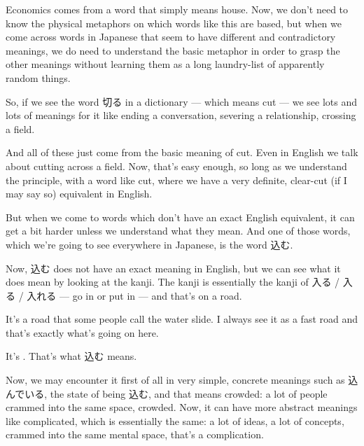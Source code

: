 Economics comes from a word that simply means house. Now, we don't need to know the physical metaphors on which words like this are based, but when we come across words in Japanese that seem to have different and contradictory meanings, we do need to understand the basic metaphor in order to grasp the other meanings without learning them as a long laundry-list of apparently random things.

So, if we see the word 切る in a dictionary --- which means cut --- we see lots and lots of meanings for it like ending a conversation, severing a relationship, crossing a field.

{}

And all of these just come from the basic meaning of cut. Even in English we talk about cutting across a field. Now, that's easy enough, so long as we understand the principle, with a word like cut, where we have a very definite, clear-cut (if I may say so) equivalent in English.

But when we come to words which don't have an exact English equivalent, it can get a bit harder unless we understand what they mean. And one of those words, which we're going to see everywhere in Japanese, is the word 込む.

\startsectionlevel[title={込む},reference={込む}]

Now, 込む does not have an exact meaning in English, but we can see what it does mean by looking at the kanji. The kanji is essentially the kanji of 入る / 入る / 入れる --- go in or put in --- and that's on a road.

{}

It's a road that some people call the water slide. I always see it as a fast road and that's exactly what's going on here.

It's . That's what 込む means.

Now, we may encounter it first of all in very simple, concrete meanings such as 込んでいる, the state of being 込む, and that means crowded: a lot of people crammed into the same space, crowded. Now, it can have more abstract meanings like complicated, which is essentially the same: a lot of ideas, a lot of concepts, crammed into the same mental space, that's a complication.

\startsectionlevel[title={飛び込む},reference={飛び込む}]

